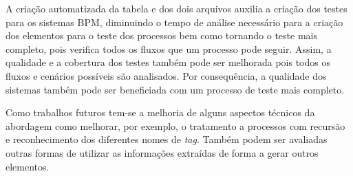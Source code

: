 \documentclass[12pt]{article}
\begin{document}
A criação automatizada da tabela e dos dois arquivos auxilia a criação dos testes para os sistemas BPM, diminuindo o tempo de análise necessário para a criação dos elementos para o teste dos processos bem como tornando o teste mais completo, pois verifica todos os fluxos que um processo pode seguir. Assim, a qualidade e a cobertura dos testes também pode ser melhorada pois todos os fluxos e cenários possíveis são analisados. Por consequência, a qualidade dos sistemas também pode ser beneficiada com um processo de teste mais completo.

Como trabalhos futuros tem-se a melhoria de alguns aspectos técnicos da abordagem como melhorar, por exemplo, o tratamento a processos com recursão e reconhecimento dos diferentes nomes de \emph{tag}. Também podem ser avaliadas outras formas de utilizar as informações extraídas de forma a gerar outros elementos.
 




\end{document}
